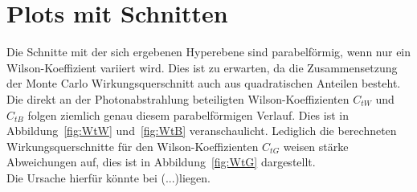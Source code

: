 \section{Plots mit Schnitten}
Die Schnitte mit der sich ergebenen Hyperebene sind parabelförmig, wenn nur ein Wilson-Koeffizient variiert wird. Dies ist zu erwarten, da die Zusammensetzung der Monte Carlo Wirkungsquerschnitt auch aus quadratischen Anteilen besteht. Die direkt an der Photonabstrahlung beteiligten Wilson-Koeffizienten $C_{tW}$ und $C_{tB}$ folgen ziemlich genau diesem parabelförmigen Verlauf. Dies ist in Abbildung~\ref{fig:WtW} und~\ref{fig:WtB} veranschaulicht. Lediglich die berechneten Wirkungsquerschnitte für den Wilson-Koeffizienten $C_{tG}$ weisen stärke Abweichungen auf, dies ist in Abbildung~\ref{fig:WtG} dargestellt.\\
Die Ursache hierfür könnte bei (...)liegen.
